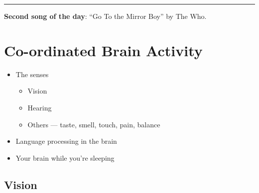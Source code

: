 \documentclass[12pt]{article}
\begin{document}
\hrule

\textbf{Second song of the day}: ``Go To the Mirror Boy'' by The Who.

\section{Co-ordinated Brain Activity}

\begin{itemize}
    \item The senses
        \begin{itemize}
            \item Vision
            \item Hearing
            \item Others --- taste, smell, touch, pain, balance
        \end{itemize}
    \item Language processing in the brain
    \item Your brain while you're sleeping
\end{itemize}

\subsection{Vision}
\end{document}

